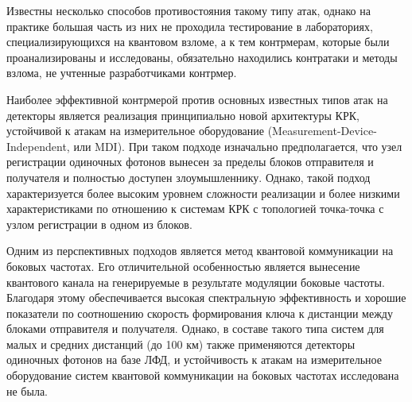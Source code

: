 	Известны несколько способов противостояния такому типу атак, однако на практике большая часть из них не проходила тестирование в лабораториях, специализирующихся на квантовом взломе, а к тем контрмерам, которые были проанализированы и исследованы, обязательно находились контратаки и методы взлома, не учтенные разработчиками контрмер. 
	
	Наиболее эффективной контрмерой против основных известных типов атак на детекторы является реализация принципиально новой архитектуры КРК, устойчивой к атакам на измерительное оборудование (Measurement-Device-Independent, или MDI). При таком подходе изначально предполагается, что узел регистрации одиночных фотонов вынесен за пределы блоков отправителя и получателя и полностью доступен злоумышленнику. Однако, такой подход характеризуется более высоким уровнем сложности реализации и более низкими характеристиками по отношению к системам КРК с топологией точка-точка с узлом регистрации в одном из блоков. 
	
	Одним из перспективных подходов является метод квантовой коммуникации на боковых частотах. Его отличительной особенностью является вынесение квантового канала на генерируемые в результате модуляции боковые частоты. Благодаря этому обеспечивается высокая спектральную эффективность и хорошие показатели по соотношению скорость формирования ключа к дистанции между блоками отправителя и получателя. Однако, в составе такого типа систем для малых и средних дистанций (до 100 км) также применяются детекторы одиночных фотонов на базе ЛФД, и устойчивость к атакам на измерительное оборудование систем квантовой коммуникации на боковых частотах исследована не была. 


